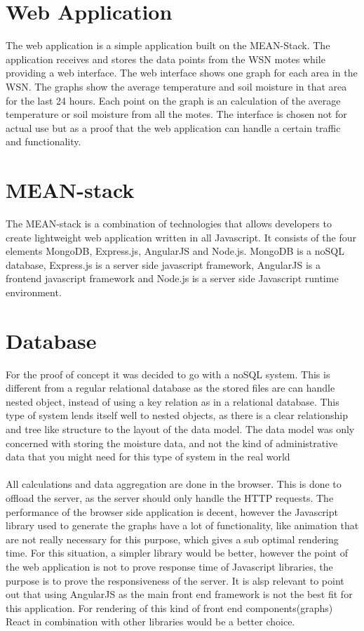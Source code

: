 \documentclass[]{uiophd}
\begin{document}
\section{Web Application}
The web application is a simple application built on the MEAN-Stack. The application receives and stores the data points from the WSN motes while providing a web interface. The web interface shows one graph for each area in the WSN. The graphs show the average temperature and soil moisture in that area for the last 24 hours. Each point on the graph is an calculation of the average temperature or soil moisture from all the motes. The interface is chosen not for actual use but as a proof that the web application can handle a certain traffic and functionality. 

\section{MEAN-stack}
The MEAN-stack is a combination of technologies that allows developers to create lightweight web application written in all Javascript. It consists of the four elements MongoDB, Express.js, AngularJS and Node.js. MongoDB is a noSQL database, Express.js is a server side javascript framework, AngularJS is a frontend javascript framework and Node.js is a server side Javascript runtime environment. 

\section{Database}
For the proof of concept it was decided to go with a noSQL system. This is different from a regular relational database as the stored files are can handle nested object, instead of using a key relation as in a relational database. This type of system lends itself well to nested objects, as there is a clear relationship and tree like structure to the layout of the data model. The data model was only concerned with storing the moisture data, and not the kind of administrative data that you might need for this type of system in the real world
\\\\
All calculations and data aggregation are done in the browser. This is done to offload the server, as the server should only handle the HTTP requests. The performance of the browser side application is decent, however the Javascript library used to generate the graphs have a lot of functionality, like animation that are not really necessary for this purpose, which gives a sub optimal rendering time. For this situation, a simpler library would be better, however the point of the web application is not to prove response time of Javascript libraries, the purpose is to prove the responsiveness of the server. It is alsp relevant to point out that using AngularJS as the main front end framework is not the best fit for this application. For rendering of this kind of front end components(graphs) React in combination with other libraries would be a better choice. 
\end{document}

